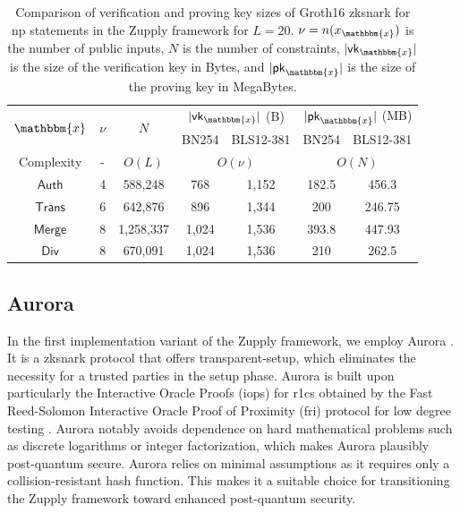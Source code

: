 \begin{table}
 \caption[Comparison of the Groth16 key sizes for each NP statement in Zupply]{Comparison of verification and proving key sizes of Groth16 \gls{zksnark} for \gls{np} statements in the Zupply framework for $L=20$. $\nu = n(x_\mathbbm{x})$ is the number of public inputs, $N$ is the number of constraints, $|\mathsf{vk}_\mathbbm{x}|$ is the size of the verification key in Bytes, and  $|\mathsf{pk}_\mathbbm{x}|$ is the size of the proving key in MegaBytes.}
	\centering

\begin{tabular}{ccccccc}
		\toprule
		\multirow{2}{*}{\textbf{$\mathbbm{x}$}} & \multirow{2}{*}{\textbf{$\nu$}} & \multirow{2}{*}{$N$} & \multicolumn{2}{c}{$|\mathsf{vk}_\mathbbm{x}|$ (B)} & \multicolumn{2}{c}{$|\mathsf{pk}_\mathbbm{x}|$ (MB)} \\
		 &  &  & {\footnotesize BN254} & {\footnotesize BLS12-381} & {\footnotesize BN254} & {\footnotesize BLS12-381} \\
		\midrule
        Complexity & - & $O(L)$ & \multicolumn{2}{c}{$O(\nu)$}  & \multicolumn{2}{c}{$O(N)$}\\
        
		${\textsf{Auth}}$ & 4  & 588,248  & 768 & 1,152 & 182.5 & 456.3\\
		
		${\textsf{Trans}}$ & 6  & 642,876  & 896 & 1,344 & 200 & 246.75\\
		${\textsf{Merge}}$ & 8 & 1,258,337  & 1,024 & 1,536 & 393.8 & 447.93\\
		${\textsf{Div}}$ & 8 & 670,091  & 1,024 & 1,536 & 210 & 262.5\\
		\bottomrule
	\end{tabular}
	\label{tab:zksize}
\end{table}

\subsection{Aurora}

In the first implementation variant of the Zupply framework, we employ Aurora \cite{Aurora2019}. It is a \gls{zksnark} protocol  that offers transparent-setup, which eliminates the necessity for a trusted parties in the setup phase. Aurora is built upon particularly the Interactive Oracle Proofs (\gls{iop}s) \cite{Ben-Sasson2016IOP} for \gls{r1cs} obtained by the Fast Reed-Solomon Interactive Oracle Proof of Proximity (\gls{fri}) protocol for low degree testing \cite{Ben-Sasson2018FRI}. Aurora notably avoids dependence on hard mathematical problems such as discrete logarithms or integer factorization, which makes Aurora plausibly post-quantum secure. Aurora relies on minimal assumptions as it requires only a collision-resistant hash function. This makes it a suitable choice for transitioning the Zupply framework toward enhanced post-quantum security.


